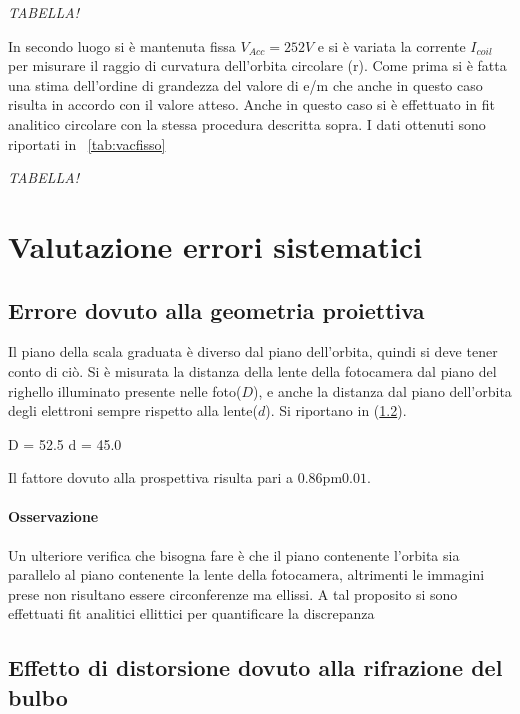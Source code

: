 \documentclass[10pt,a4paper]{article}
\begin{document}
\emph{TABELLA!}

In secondo luogo si è mantenuta fissa $V_{Acc} = \unit{252}{V}$ e si è variata la corrente $I_{coil}$ per misurare il raggio di curvatura dell'orbita circolare (r). Come prima si è fatta una stima dell'ordine di grandezza del valore di e/m che anche in questo caso risulta in accordo con il valore atteso.
Anche in questo caso si è effettuato in fit analitico circolare con la stessa procedura descritta sopra. I dati ottenuti sono riportati in \tablename{~\ref{tab:vacfisso}}

\emph{TABELLA!}
\section{Valutazione errori sistematici}

\subsection{Errore dovuto alla geometria proiettiva}
Il piano della scala graduata è diverso dal piano dell'orbita, quindi si deve tener conto di ciò. Si è misurata la distanza della lente della fotocamera dal piano del righello illuminato presente nelle foto($D$), e anche la distanza dal piano dell'orbita degli elettroni sempre rispetto alla lente($d$).
Si riportano in \tablename(\ref{}).

D = 52.5 
d = 45.0 

Il fattore dovuto alla prospettiva risulta pari a $\unit{0.86 \pm 0.01}$. 

\paragraph{Osservazione}
Un ulteriore verifica che bisogna fare è che il piano contenente l'orbita sia parallelo al piano contenente la lente della fotocamera, altrimenti le immagini prese non risultano essere circonferenze ma ellissi. A tal proposito si sono effettuati fit analitici ellittici per quantificare la discrepanza 

\subsection{Effetto di distorsione dovuto alla rifrazione del bulbo}
\end{document}
